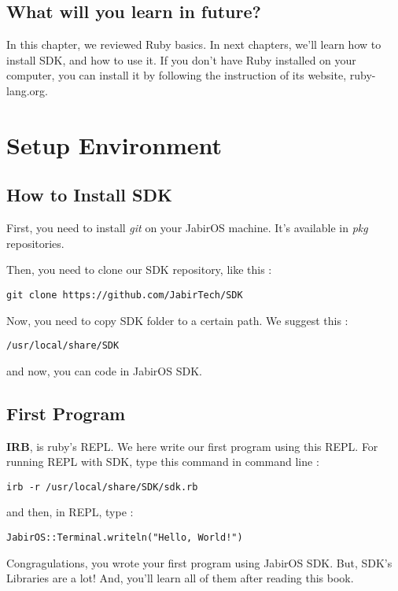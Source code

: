 \documentclass[11pt]{article}
\begin{document}
\subsection{What will you learn in future?}
In this chapter, we reviewed Ruby basics. In next chapters, we'll learn how to install SDK, and how to use it. If you don't have Ruby installed on your computer, you can install it by following the instruction of its website, ruby-lang.org. 
\newpage

\section{Setup Environment}
\subsection{How to Install SDK}
First, you need to install \textit{git} on your JabirOS machine. It's available in \textit{pkg} repositories. 

Then, you need to clone our SDK repository, like this :
\begin{verbatim}
git clone https://github.com/JabirTech/SDK
\end{verbatim}
Now, you need to copy SDK folder to a certain path. We suggest this :
\begin{verbatim}
/usr/local/share/SDK
\end{verbatim}
and now, you can code in JabirOS SDK. 

\subsection{First Program}
\textbf{IRB}, is ruby's REPL. We here write our first program using this REPL. For running REPL with SDK, type this command in command line :
\begin{verbatim}
irb -r /usr/local/share/SDK/sdk.rb
\end{verbatim}
and then, in REPL, type :
\begin{verbatim}
JabirOS::Terminal.writeln("Hello, World!")
\end{verbatim}
Congragulations, you wrote your first program using JabirOS SDK. But, SDK's Libraries are a lot! And, you'll learn all of them after reading this book. 
\newpage{}
\end{document}
